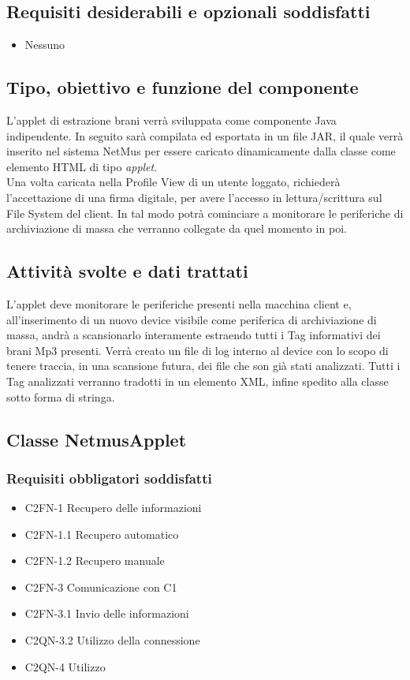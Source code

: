 \subsection*{Requisiti desiderabili e opzionali soddisfatti}
\begin{itemize}
    \item Nessuno
\end{itemize}
\subsection*{Tipo, obiettivo e funzione del componente}
L'applet di estrazione brani verr\`a sviluppata come componente
Java indipendente. In seguito sar\`a compilata ed esportata in un file JAR, il
quale verr\`a inserito nel sistema NetMus per essere caricato dinamicamente
dalla classe  come elemento HTML di tipo \emph{applet}.\\
Una volta caricata nella Profile View di un utente loggato, richieder\`a
l'accettazione di una firma digitale, per avere l'accesso in lettura/scrittura
sul File System del client. In tal modo potr\`a cominciare a monitorare le
periferiche di archiviazione di massa che verranno collegate da quel momento in
poi.
\subsection*{Attivit\`a svolte e dati trattati}
L'applet deve monitorare le periferiche presenti nella macchina client e,
all'inserimento di un nuovo device visibile come periferica di archiviazione di
massa, andr\`a a scansionarlo interamente estraendo tutti i Tag informativi dei
brani Mp3 presenti. Verr\`a creato un file di log interno al device con lo scopo
di tenere traccia, in una scansione futura, dei file che son gi\`a stati
analizzati. Tutti i Tag analizzati verranno tradotti in un elemento XML, infine
spedito alla classe  sotto forma di stringa.\\

\subsection{Classe NetmusApplet}
\subsubsection*{Requisiti obbligatori soddisfatti}
\begin{itemize}
   \item C2FN-1 Recupero delle informazioni
   \item C2FN-1.1 Recupero automatico
   \item C2FN-1.2 Recupero manuale
   \item C2FN-3 Comunicazione con C1
   \item C2FN-3.1 Invio delle informazioni
   \item C2QN-3.2 Utilizzo della connessione
   \item C2QN-4 Utilizzo
\end{itemize}
